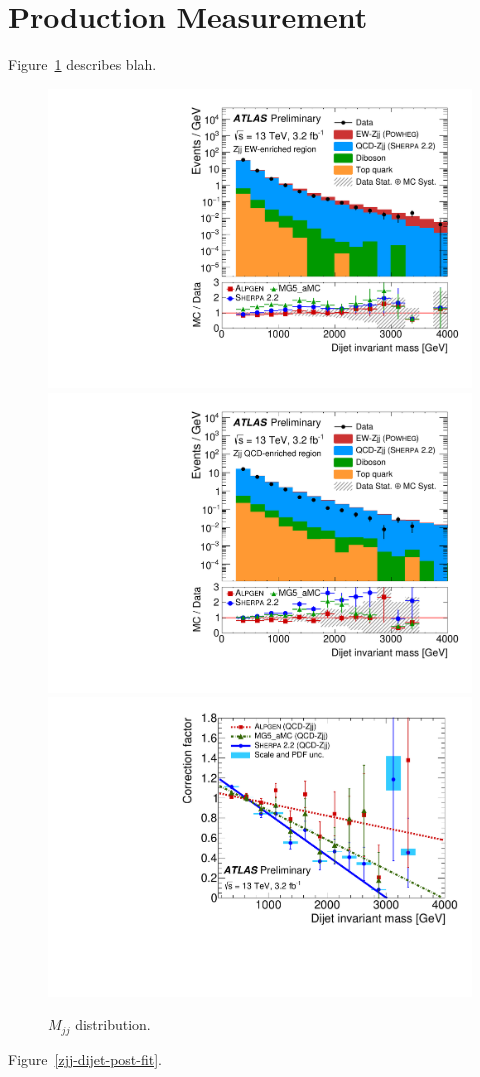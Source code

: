 \documentclass{PoS}
\begin{document}



\section{\zjj Production Measurement}

Figure~\ref{zjj-dijet-mismodeling} describes blah.

\begin{figure}
  \includegraphics[width=.33\textwidth]{STDM-2016-09/fig_02a.pdf}
  \includegraphics[width=.33\textwidth]{STDM-2016-09/fig_02b.pdf}
  \includegraphics[width=.33\textwidth]{STDM-2016-09/fig_03a.pdf}
  \caption{$M_{jj}$ distribution.}
  \label{zjj-dijet-mismodeling}
\end{figure}

Figure~\ref{zjj-dijet-post-fit}.
\end{document}
